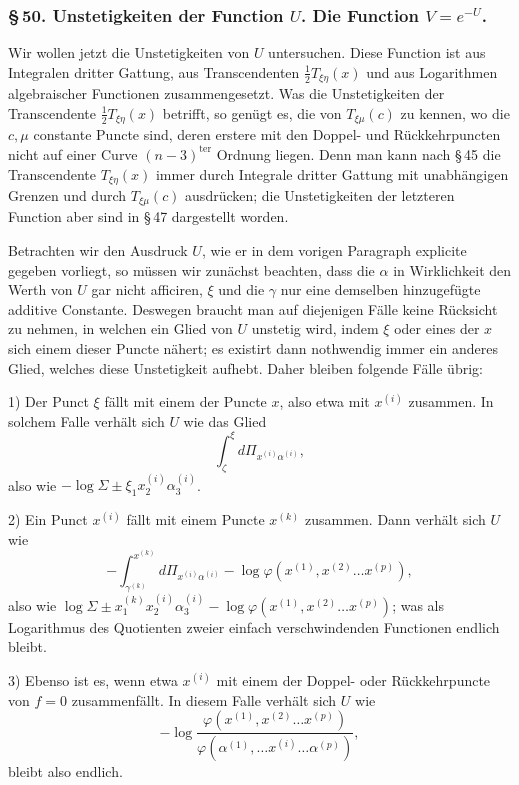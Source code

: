 \documentclass[10pt]{article}
\begin{document}
\subsubsection*{\S\,50. Unstetigkeiten der Function \(U\). Die Function \(V=e^{-U}\).}

Wir wollen jetzt die Unstetigkeiten von \(U\) untersuchen. Diese Function ist aus Integralen dritter Gattung, aus Transcendenten \(\frac12T_{\xi\eta}(x)\) und aus Logarithmen algebraischer Functionen zusammengesetzt. Was die Unstetigkeiten der Transcendente \(\frac12T_{\xi\eta}(x)\) betrifft, so genügt es, die von \(T_{\xi\mu}(c)\) zu kennen, wo die \(c,\mu\) constante Puncte sind, deren erstere mit den Doppel- und Rückkehrpuncten nicht auf einer Curve \((n-3)^{\mathrm{ter}}\) Ordnung liegen. Denn man kann nach \S\,45 die Transcendente \(T_{\xi\eta}(x)\) immer durch Integrale dritter Gattung mit unabhängigen Grenzen und durch \(T_{\xi\mu}(c)\) ausdrücken; die Unstetigkeiten der letzteren Function aber sind in \S\,47 dargestellt worden.

Betrachten wir den Ausdruck \(U\), wie er in dem vorigen Paragraph explicite gegeben vorliegt, so müssen wir zunächst beachten, dass die \(\alpha\) in Wirklichkeit den Werth von \(U\) gar nicht afficiren, \(\xi\) und die \(\gamma\) nur eine demselben hinzugefügte additive Constante. Deswegen braucht man auf diejenigen Fälle keine Rücksicht zu nehmen, in welchen ein Glied von \(U\) unstetig wird, indem \(\xi\) oder eines der \(x\) sich einem dieser Puncte nähert; es existirt dann nothwendig immer ein anderes Glied, welches diese Unstetigkeit aufhebt. Daher bleiben folgende Fälle übrig:

1) Der Punct \(\xi\) fällt mit einem der Puncte \(x\), also etwa mit \(x^{(i)}\) zusammen. In solchem Falle verhält sich \(U\) wie das Glied
\[
\int_{\zeta}^{\xi}d\Pi_{x^{(i)}\alpha^{(i)}},
\]
also wie \(-\log\Sigma\pm\xi_1x_2^{(i)}\alpha_3^{(i)}\).

2) Ein Punct \(x^{(i)}\) fällt mit einem Puncte \(x^{(k)}\) zusammen. Dann verhält sich \(U\) wie
\[
-\int_{\gamma^{(k)}}^{x^{(k)}}d\Pi_{x^{(i)}\alpha^{(i)}}-\log\varphi(x^{(1)},x^{(2)}\ldots x^{(p)}),
\]
also wie \(\log\Sigma\pm x_1^{(k)}x_2^{(i)}\alpha_3^{(i)}-\log\varphi(x^{(1)},x^{(2)}\ldots x^{(p)})\); was als Logarithmus des Quotienten zweier einfach verschwindenden Functionen endlich bleibt.

3) Ebenso ist es, wenn etwa \(x^{(i)}\) mit einem der Doppel- oder Rückkehrpuncte von \(f=0\) zusammenfällt. In diesem Falle verhält sich \(U\) wie
\[
-\log\frac{\varphi(x^{(1)},x^{(2)}\ldots x^{(p)})}{\varphi(\alpha^{(1)},\ldots x^{(i)}\ldots\alpha^{(p)})},
\]
bleibt also endlich.
\end{document}
